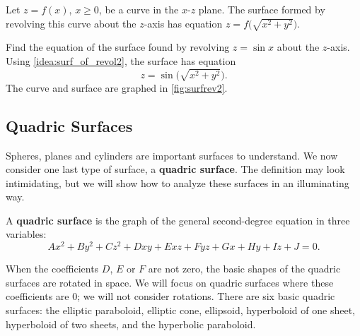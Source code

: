 \begin{keyidea}\label{idea:surf_of_revol2}
Let $z=f(x)$, $x\geq 0$, be a curve in the $x$-$z$ plane. The surface formed by revolving this curve about the $z$-axis has equation $z=f\bigl(\sqrt{x^2+y^2}\bigr)$.
\end{keyidea}

%
\begin{example}\label{ex_surfrev2}
Find the equation of the surface found by revolving $z=\sin x$ about the $z$-axis.
\solution
Using \autoref{idea:surf_of_revol2}, the surface has equation \[z=\sin\bigl(\sqrt{x^2+y^2}\bigr).\]
The curve and surface are graphed in \autoref{fig:surfrev2}.
\end{example}

\subsection{Quadric Surfaces}

Spheres, planes and cylinders are important surfaces to understand. We now consider one last type of surface, a \textbf{quadric surface}. The definition may look intimidating, but we will show how to analyze these surfaces in an illuminating way.

\begin{definition}\label{def:quadric}
A \textbf{quadric surface} is the graph of the general second-degree equation in three variables:
\[Ax^2+By^2+Cz^2+Dxy+Exz+Fyz+Gx+Hy+Iz+J=0.\]
\end{definition}

When the coefficients $D$, $E$ or $F$ are not zero, the basic shapes of the quadric surfaces are rotated in space. We will focus on quadric surfaces where these coefficients are 0; we will not consider rotations. There are six basic quadric surfaces: the elliptic paraboloid, elliptic cone, ellipsoid, hyperboloid of one sheet, hyperboloid of two sheets, and the hyperbolic paraboloid.

